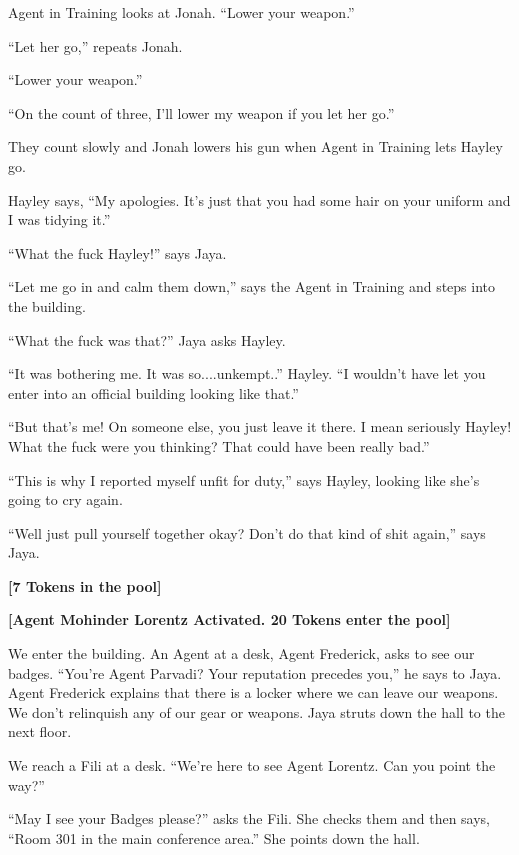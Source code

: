 Agent in Training looks at Jonah.  ``Lower your weapon.''

``Let her go,'' repeats Jonah.

``Lower your weapon.''

``On the count of three, I'll lower my weapon if you let her go.''

They count slowly and Jonah lowers his gun when Agent in Training lets Hayley go.

Hayley says, ``My apologies.  It's just that you had some hair on your uniform and I was tidying it.''  

``What the fuck Hayley!'' says Jaya.

``Let me go in and calm them down,'' says the Agent in Training and steps into the building.

``What the fuck was that?'' Jaya asks Hayley.

``It was bothering me.  It was so....unkempt..'' Hayley.  ``I wouldn't have let you enter into an official building looking like that.''

``But that's me!  On someone else, you just leave it there.  I mean seriously Hayley!  What the fuck were you thinking?  That could have been really bad.''

``This is why I reported myself unfit for duty,'' says Hayley, looking like she's going to cry again.

``Well just pull yourself together okay?  Don't do that kind of shit again,'' says Jaya.



\textbf{{[}7 Tokens in the pool{]}}



\textbf{{[}Agent Mohinder Lorentz Activated.  20 Tokens enter the pool{]}}



We enter the building.  An Agent at a desk, Agent Frederick, asks to see our badges.  ``You're Agent Parvadi?  Your reputation precedes you,'' he says to Jaya.   Agent Frederick explains that there is a locker where we can leave our weapons.  We don't relinquish any of our gear or weapons.  Jaya struts down the hall to the next floor.



We reach a Fili at a desk.  ``We're here to see Agent Lorentz.  Can you point the way?''

``May I see your Badges please?'' asks the Fili.  She checks them and then says, ``Room 301 in the main conference area.''  She points down the hall.



